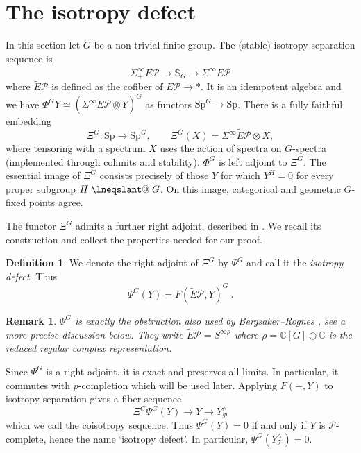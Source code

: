 \documentclass[11pt,a4paper]{article}
\makeatletter
\newtheorem{remark}[thm]{Remark}
\theoremstyle{definition}
\newtheorem{defn}[thm]{Definition}
\newcommand{\Sp}{\mathrm{Sp}}
\newcommand{\SpG}{\mathrm{Sp}^{G}}
\newcommand{\Sph}{\mathbb S}
\newcommand{\Pp}{\mathcal P}
\newcommand{\Tt}{\mathcal T}
\newcommand{\EP}{E\mathcal P}
\newcommand{\tEP}{\widetilde E\mathcal P}
\DeclareRobustCommand{\lneqslant}{%
  \mathrel{\mathpalette\lneqslant@{}}}
\newcommand{\lneqslant@}[2]{%
  \begingroup
  \setbox0=\hbox{$\m@th#1\leqslant$}%
  \ooalign{\copy0\cr
    \hidewidth\raisebox{-.10\wd0}[0pt][0pt]{%
      \rotatebox[origin=c]{55}{\rule{.42\wd0}{.05\wd0}}}%
    \hidewidth\cr}%
  \endgroup}
\makeatother
\begin{document}
\section{The isotropy defect}\label{sec:isotropy defect}

In this section let $G$ be a non-trivial finite group. The (stable) isotropy separation sequence is
\[
 \Sigma^\infty_+\EP\longrightarrow\Sph_G
 \longrightarrow\Sigma^\infty\tEP
\]
where $\tEP$ is defined as the cofiber of $\EP\to *$. It is an idempotent algebra and we have
$
 \Phi^G Y\simeq(\Sigma^\infty\tEP\otimes Y)^G$ as functors $\SpG \to \Sp$. 
There is a fully faithful embedding
\[
 \Xi^G:\Sp\longrightarrow\SpG,\qquad
 \Xi^G(X)=\Sigma^\infty\tEP\otimes X,
\]
where tensoring with a spectrum $X$ uses the action of spectra on $G$-spectra (implemented through colimits and stability).  $\Phi^G$ is left adjoint to
$\Xi^G$.
The essential image of $\Xi^G$ consists precisely of
those $Y$ for which $Y^H=0$ for every proper subgroup $H \lneqslant G$. On this image, categorical
and geometric $G$-fixed points agree. 

The functor $\Xi^G$ admits a further right adjoint, described in
\cite[\S2.6]{HKS}. We recall its construction and collect the
properties needed for our proof.


\begin{defn}
We denote the right adjoint of $\Xi^G$ by $\Psi^G$ and call it the
\emph{isotropy defect}. Thus
\begin{equation*}\Psi^G(Y)=F(\tEP,Y)^G \ .
\end{equation*}
\end{defn}
\begin{remark}
$\Psi^G$  is exactly the obstruction also used by Bergsaker--Rognes \cite[Proposition~2.2 and Definition~2.3]{BR}, see  a more precise discussion below. They write $\tEP = S^{\infty\rho}$ where
$\rho=\mathbb C[G]\ominus \mathbb C$ is the reduced regular complex
representation.
\end{remark}

Since  $\Psi^G$ is a right adjoint, it is exact and preserves all limits. In particular, it commutes with
$p$-completion which will be used later.  Applying $F(-,Y)$ to isotropy separation gives a fiber sequence
\begin{equation}\label{coisotropy_sequence}
 \Xi^G\Psi^G(Y)\longrightarrow Y\longrightarrow Y^\wedge_{\Pp}
\end{equation}
which we call the coisotropy sequence.
Thus $\Psi^G(Y)=0$ if and only if $Y$ is $\Pp$-complete, hence the name `isotropy defect'. In particular,
$\Psi^G(Y^\wedge_{\Tt})=0$.
\end{document}
